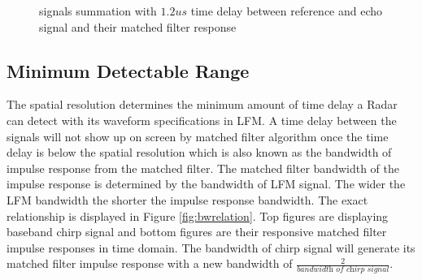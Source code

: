 \documentclass[letterpaper, 12 pt, conference]{report}
\numberwithin{figure}{section}
\begin{document}
\begin{appendices}
\begin{figure}[h]
\centering{}
\caption{signals summation with $1.2us$ time delay between reference and echo signal and their matched filter response}
\label{fig:sig1dot2add}
\end{figure}
\FloatBarrier
\subsection{Minimum Detectable Range}
\label{app:minDR}
The spatial resolution determines the minimum amount of time delay a Radar can detect with its waveform specifications in LFM. A time delay between the signals will not show up on screen by matched filter algorithm once the time delay is below the spatial resolution which is also known as the bandwidth of impulse response from the matched filter. The matched filter bandwidth of the impulse response is determined by the bandwidth of LFM signal. The wider the LFM bandwidth the shorter the impulse response bandwidth. The exact relationship is displayed in Figure \ref{fig:bwrelation}. Top figures are displaying baseband chirp signal and bottom figures are their responsive matched filter impulse responses in time domain. The bandwidth of chirp signal will generate its matched filter impulse response with a new bandwidth of $\frac{2}{\textit{bandwidth of chirp signal}}$.\\


\end{appendices}
\end{document}
